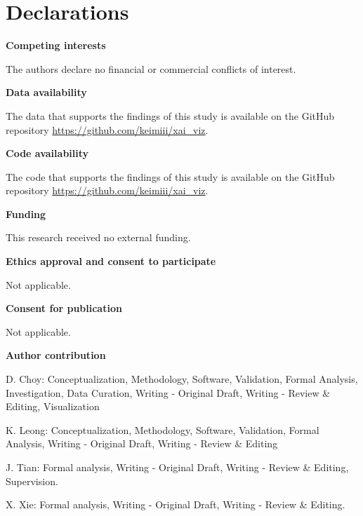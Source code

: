 \documentclass[lineno,pdflatex,sn-mathphys-num]{sn-jnl}%
\theoremstyle{thmstyleone}%
\theoremstyle{thmstyletwo}%
\theoremstyle{thmstylethree}%
\begin{document}

\maketitle



\section*{Declarations}

\noindent\textbf{Competing interests}

The authors declare no financial or commercial conflicts of interest. \newline

\noindent\textbf{Data availability }

The data that supports the findings of this study is available on the GitHub repository \url{https://github.com/keimiii/xai\_viz}.\newline

\noindent\textbf{Code availability }

The code that supports the findings of this study is available on the GitHub repository \url{https://github.com/keimiii/xai\_viz}.\newline


\noindent\textbf{Funding}

This research received no external funding. \newline


\noindent\textbf{Ethics approval and consent to participate}

Not applicable.\newline

\newpage 
\noindent\textbf{Consent for publication}

Not applicable.\newline



\noindent\textbf{Author contribution}

D. Choy: Conceptualization, Methodology, Software, Validation, Formal Analysis, Investigation, Data Curation, Writing - Original Draft, Writing - Review \& Editing, Visualization

K. Leong: Conceptualization, Methodology, Software, Validation, Formal Analysis, Writing - Original Draft, Writing - Review \& Editing

J. Tian: Formal analysis, Writing - Original Draft, Writing - Review \& Editing, Supervision.

X. Xie: Formal analysis, Writing - Original Draft, Writing - Review \& Editing.
\end{document}
